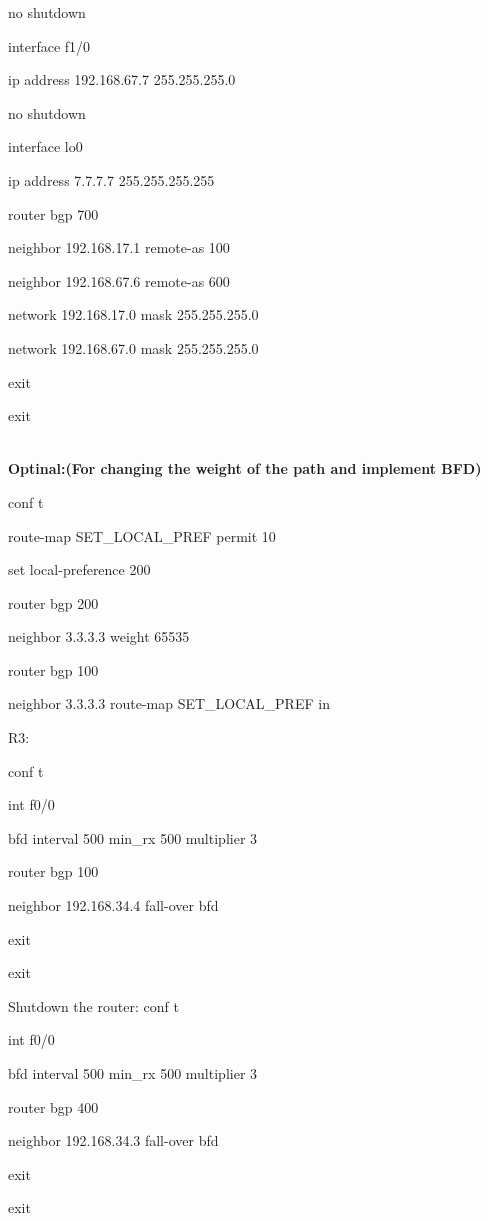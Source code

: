 \documentclass[12pt]{article}
\begin{document}
no shutdown

interface f1/0

ip address 192.168.67.7 255.255.255.0

no shutdown

interface lo0

ip address 7.7.7.7 255.255.255.255

router bgp 700

neighbor 192.168.17.1 remote-as 100

neighbor 192.168.67.6 remote-as 600

network 192.168.17.0 mask 255.255.255.0

network 192.168.67.0 mask 255.255.255.0

exit

exit

~\\
\noindent \textbf {Optinal:(For changing the weight of the path and implement BFD)}

conf t

route-map SET\_LOCAL\_PREF permit 10

set local-preference 200

router bgp 200

neighbor 3.3.3.3 weight 65535

router bgp 100

neighbor 3.3.3.3 route-map SET\_LOCAL\_PREF in

\noindent R3:

conf t

int f0/0

bfd interval 500 min\_rx 500 multiplier 3

router bgp 100 

neighbor 192.168.34.4 fall-over bfd

exit

exit

\noindent Shutdown the router:
conf t

int f0/0

bfd interval 500 min\_rx 500 multiplier 3

router bgp 400 

neighbor 192.168.34.3 fall-over bfd

exit

exit
\end{document}
